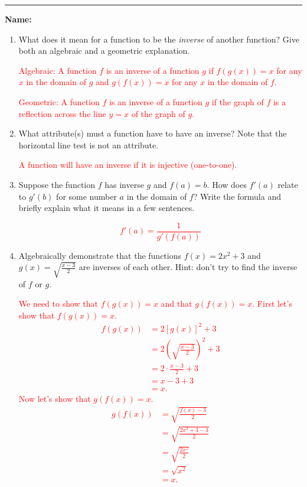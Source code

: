 \documentclass[11pt]{article}
\let\ds\displaystyle
\newcommand{\red}{\textcolor{red}}
\begin{document}
    \hrule
    \vspace{.5cm}
    \noindent\textbf{Name:} \underline{\qquad\qquad\qquad\qquad\qquad\qquad\qquad\qquad\qquad\qquad\qquad\qquad\qquad}

    \begin{enumerate}
        \item What does it mean for a function to be the \textit{inverse} of another function? Give both an algebraic and a geometric explanation.
        
        \red{Algebraic: A function $f$ is an inverse of a function $g$ if $f(g(x))=x$ for any $x$ in the domain of $g$ and $g(f(x))=x$ for any $x$ in the domain of $f$.}
        

        \red{Geometric: A function $f$ is an inverse of a function $g$ if the graph of $f$ is a reflection across the line $y=x$ of the graph of $g$.}
        
        \item What attribute(s) must a function have to have an inverse? Note that the horizontal line test is not an attribute.
        

        \red{A function will have an inverse if it is injective (one-to-one).}
        
        \item Suppose the function $f$ has inverse $g$ and $f(a)=b$. How does $f'(a)$ relate to $g'(b)$ for some number $a$ in the domain of $f$? Write the formula and briefly explain what it means in a few sentences.
        
        \red{$$f'(a)=\frac{1}{g'(f(a))}$$}
        
        \item Algebraically demonstrate that the functions $f(x)=2x^{2}+3$ and $g(x)=\ds\sqrt{\frac{x-3}{2}}$ are inverses of each other. Hint: don't try to find the inverse of $f$ or $g$.
        
        \red{We need to show that $f(g(x))=x$ and that $g(f(x))=x$. First let's show that $f(g(x))=x$.}
        \textcolor{red}{
            \begin{align*}
                f(g(x)) &=  2\left[g(x)\right]^2+3\\
                        &=  2\left(\sqrt{\frac{x-3}{2}}\right)^{2}+3\\
                        &=  2\cdot\frac{x-3}{2}+3\\
                        &=  x-3+3\\
                        &=  x.
            \end{align*}
        }
        \red{Now let's show that $g(f(x))=x$.}
        \textcolor{red}{
            \begin{align*}
                g(f(x)) &=  \sqrt{\frac{f(x)-3}{2}}\\
                        &=  \sqrt{\frac{2x^{2}+3-3}{2}}\\
                        &=  \sqrt{\frac{2x^{2}}{2}}\\
                        &=  \sqrt{x^{2}}\\
                        &=  x.
            \end{align*}
        }


\end{enumerate}
\end{document}
